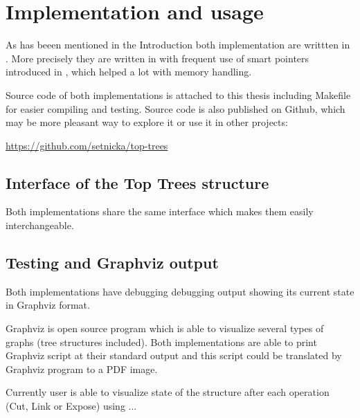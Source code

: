 \chapter{Implementation and usage}
\label{chap:Implementation}

As has beeen mentioned in the Introduction both implementation are writtten
in \Cpp. More precisely they are written in  with frequent use of smart
pointers introduced in , which helped a lot with memory handling.

Source code of both implementations is attached to this thesis including
Makefile for easier compiling and testing. Source code is also published on
Github, which may be more pleasant way to explore it or use it in other
projects:

\bigskip
\centerline{\url{https://github.com/setnicka/top-trees}}
\bigskip

\section{Interface of the Top Trees structure}

Both implementations share the same interface which makes them easily
interchangeable.


\section{Testing and Graphviz output}

Both implementations have debugging debugging output showing its current state
in Graphviz format.

Graphviz is open source program which is able to visualize several types of
graphs (tree structures included). Both implementations are able to print
Graphviz script at their standard output and this script could be translated by
Graphviz program to a PDF image.

Currently user is able to visualize state of the structure after each operation
(Cut, Link or Expose) using ... 
